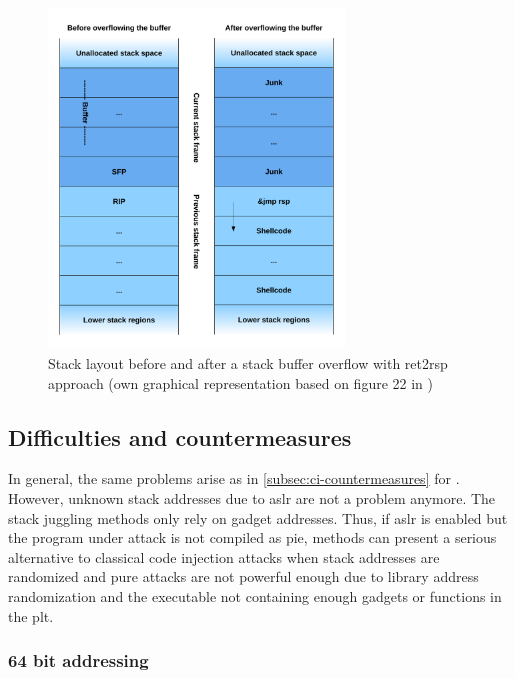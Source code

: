 \begin{figure}[htb]
	\centering
	\includegraphics[width=0.7\textwidth]{figures/ret2rsp}
	\caption{Stack layout before and after a stack buffer overflow with ret2rsp approach (own graphical representation based on figure 22 in \cite[13]{Mueller2008})}
	\label{fig:ret2rsp}
\end{figure}

\subsection{Difficulties and countermeasures}
\label{subsec:aici-countermeasures}

In general, the same problems arise as in \cref{subsec:ci-countermeasures} for .
However, unknown stack addresses due to \gls{aslr} are not a problem anymore.
The stack juggling methods only rely on gadget addresses.
Thus, if \gls{aslr} is enabled but the program under attack is not compiled as \gls{pie},  methods can present a serious alternative to classical code injection attacks when stack addresses are randomized and pure  attacks are not powerful enough due to library address randomization and the executable not containing enough gadgets or functions in the \gls{plt}.

\subsubsection{64 bit addressing}
\label{subsubsec:aici-64bit-addressing}

